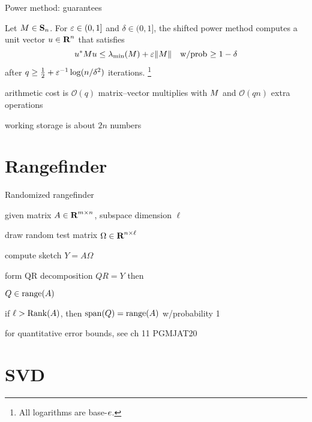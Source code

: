 \documentclass[presentation,xcolor={usenames,dvipsnames}]{beamer}
\begin{document}
\begin{frame}{Power method: guarantees}

\begin{fact}
Let $M \in \mathbf{S}_n$. For $\varepsilon \in (0,1]$ and $\delta \in (0, 1]$,
the shifted power method
computes a unit vector $u \in {\mbox{\bf R}}^n$ that satisfies
$$
u^* M u \leq \lambda_{\min}(M) + \varepsilon \|M\|
\quad\text{w/prob $\geq 1 - \delta$}
$$
after $q \geq \tfrac{1}{2} + \varepsilon^{-1} \log(n/\delta^2)$ iterations.%
\footnote{All logarithms are base-$e$.}
\end{fact}

\vfill
\bit
\item arithmetic cost is $\mathcal{O}( q )$ matrix--vector multiplies with $M$ and $\mathcal{O}(q n)$ extra operations
\item working storage is about $2n$ numbers
\eit

\end{frame}

\section{Rangefinder}

\begin{frame}{Randomized rangefinder}

given matrix $A \in {\mbox{\bf R}}^{m \times n}$, subspace dimension $\ell$
\bit
\item draw random test matrix $\Omega \in {\mbox{\bf R}}^{n \times \ell}$
\item compute sketch $Y = A \Omega$ 
\item form QR decomposition $QR = Y$ 
\eit
\pause \vfill
then
\bit
\item $Q \in \mbox{\textrm{range}}(A)$
\item if $\ell > \mbox{\textrm{Rank}}(A)$, then $\mbox{\textrm{span}}(Q) = \mbox{\textrm{range}}(A)$ w/probability 1
\item for quantitative error bounds, see ch 11 PGMJAT20
\eit

\end{frame}

\section{SVD}
\end{document}
